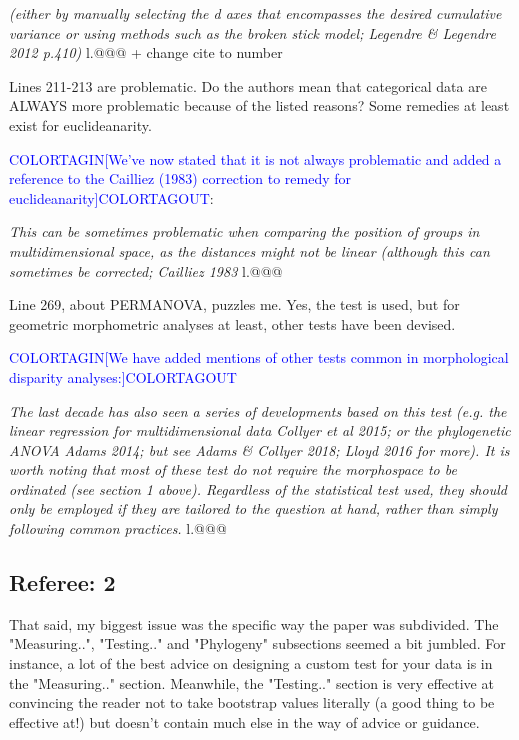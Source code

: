 \documentclass[12pt,letterpaper]{article}
\begin{document}
\textit{(either by manually selecting the d axes that encompasses the desired cumulative variance or using methods such as the broken stick model; Legendre \& Legendre 2012 p.410)} l.@@@ + change cite to number

\noindent Lines 211-213 are problematic. Do the authors mean that categorical data are ALWAYS more problematic because of the listed reasons? Some remedies at least exist for euclideanarity.

\textcolor{blue}{COLORTAGIN[We've now stated that it is not always problematic and added a reference to the Cailliez (1983) correction to remedy for euclideanarity]COLORTAGOUT}:

\textit{This can be sometimes problematic when comparing the position of groups in multidimensional space, as the distances might not be linear (although this can sometimes be corrected; Cailliez 1983} l.@@@

\noindent Line 269, about PERMANOVA, puzzles me. Yes, the test is used, but for geometric morphometric analyses at least, other tests have been devised.

\textcolor{blue}{COLORTAGIN[We have added mentions of other tests common in morphological disparity analyses:]COLORTAGOUT}

\textit{The last decade has also seen a series of developments based on this test (e.g. the linear regression for multidimensional data Collyer et al 2015; or the phylogenetic ANOVA Adams 2014; but see Adams \& Collyer 2018; Lloyd 2016 for more).
It is worth noting that most of these test do not require the morphospace to be ordinated (see section 1 above).
Regardless of the statistical test used, they should only be employed if they are tailored to the question at hand, rather than simply following common practices.} l.@@@

\subsection{Referee: 2}

\noindent That said, my biggest issue was the specific way the paper was subdivided. The "Measuring..", "Testing.." and "Phylogeny" subsections seemed a bit jumbled. For instance, a lot of the best advice on designing a custom test for your data is in the "Measuring.." section. Meanwhile, the "Testing.." section is very effective at convincing the reader not to take bootstrap values literally (a good thing to be effective at!) but doesn't contain much else in the way of advice or guidance.
\end{document}
